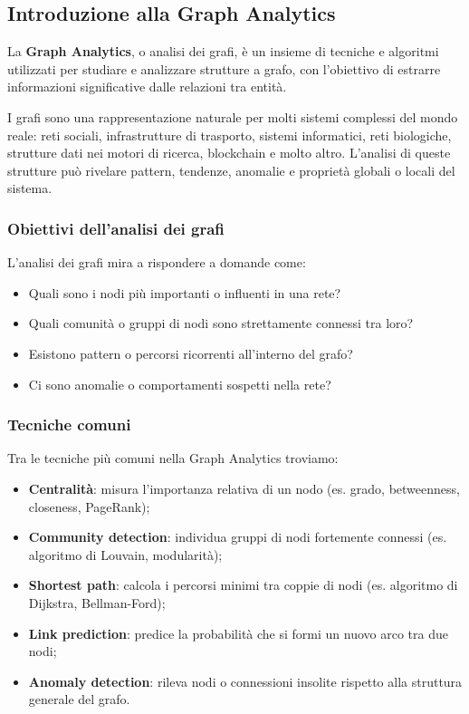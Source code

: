 \subsection{Introduzione alla Graph Analytics}

La \textbf{Graph Analytics}, o analisi dei grafi, è un insieme di tecniche e algoritmi utilizzati per studiare e analizzare strutture a grafo, con l'obiettivo di estrarre informazioni significative dalle relazioni tra entità.

I grafi sono una rappresentazione naturale per molti sistemi complessi del mondo reale: reti sociali, infrastrutture di trasporto, sistemi informatici, reti biologiche, strutture dati nei motori di ricerca, blockchain e molto altro. L’analisi di queste strutture può rivelare pattern, tendenze, anomalie e proprietà globali o locali del sistema.

\subsubsection*{Obiettivi dell'analisi dei grafi}

L'analisi dei grafi mira a rispondere a domande come:
\begin{itemize}
    \item Quali sono i nodi più importanti o influenti in una rete?
    \item Quali comunità o gruppi di nodi sono strettamente connessi tra loro?
    \item Esistono pattern o percorsi ricorrenti all'interno del grafo?
    \item Ci sono anomalie o comportamenti sospetti nella rete?
\end{itemize}

\subsubsection*{Tecniche comuni}

Tra le tecniche più comuni nella Graph Analytics troviamo:
\begin{itemize}
    \item \textbf{Centralità}: misura l'importanza relativa di un nodo (es. grado, betweenness, closeness, PageRank);
    \item \textbf{Community detection}: individua gruppi di nodi fortemente connessi (es. algoritmo di Louvain, modularità);
    \item \textbf{Shortest path}: calcola i percorsi minimi tra coppie di nodi (es. algoritmo di Dijkstra, Bellman-Ford);
    \item \textbf{Link prediction}: predice la probabilità che si formi un nuovo arco tra due nodi;
    \item \textbf{Anomaly detection}: rileva nodi o connessioni insolite rispetto alla struttura generale del grafo.
\end{itemize}

